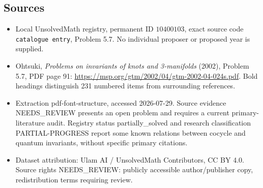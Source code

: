 \documentclass[11pt]{article}
\begin{document}
\subsection{Sources}
\begin{itemize}
\item Local UnsolvedMath registry, permanent ID \(10400103\), exact source code \texttt{catalogue entry}, Problem 5.7. No individual proposer or proposed year is supplied.
\item Ohtsuki, \emph{Problems on invariants of knots and 3-manifolds} (2002), Problem 5.7, PDF page 91: \url{https://msp.org/gtm/2002/04/gtm-2002-04-024s.pdf}. Bold headings distinguish 231 numbered items from surrounding references.
\item Extraction pdf-font-structure, accessed 2026-07-29. Source evidence NEEDS\_REVIEW presents an open problem and requires a current primary-literature audit. Registry status partially\_solved and research classification PARTIAL-PROGRESS report some known relations between cocycle and quantum invariants, without specific primary citations.
\item Dataset attribution: Ulam AI / UnsolvedMath Contributors, CC BY 4.0. Source rights NEEDS\_REVIEW: publicly accessible author/publisher copy, redistribution terms requiring review.
\end{itemize}
\end{document}
